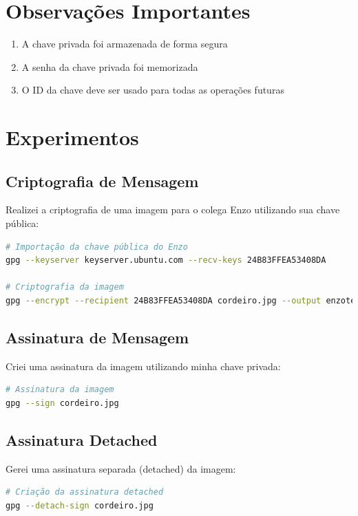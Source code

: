 \section{Observações Importantes}
\begin{enumerate}
    \item A chave privada foi armazenada de forma segura
    \item A senha da chave privada foi memorizada
    \item O ID da chave deve ser usado para todas as operações futuras
\end{enumerate}

\section{Experimentos}

\subsection{Criptografia de Mensagem}
Realizei a criptografia de uma imagem para o colega Enzo utilizando sua chave pública:

\begin{lstlisting}[language=bash]
# Importação da chave pública do Enzo
gpg --keyserver keyserver.ubuntu.com --recv-keys 24B83FFEA53408DA

# Criptografia da imagem
gpg --encrypt --recipient 24B83FFEA53408DA cordeiro.jpg --output enzote_criptografado.jpg
\end{lstlisting}

\subsection{Assinatura de Mensagem}
Criei uma assinatura da imagem utilizando minha chave privada:

\begin{lstlisting}[language=bash]
# Assinatura da imagem
gpg --sign cordeiro.jpg
\end{lstlisting}

\subsection{Assinatura Detached}
Gerei uma assinatura separada (detached) da imagem:

\begin{lstlisting}[language=bash]
# Criação da assinatura detached
gpg --detach-sign cordeiro.jpg
\end{lstlisting}


